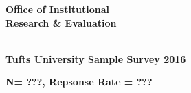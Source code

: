 \documentclass{article}
\begin{document}
\immediate{}
\pagestyle{fancy}
\fancyhf{}
\renewcommand{\headrulewidth}{0pt}
\renewcommand{\footrulewidth}{0pt}
\noindent\begin{minipage}{0.5\textwidth}
\begin{flushleft}
\end{flushleft}
\end{minipage}
\hfill
\noindent\begin{minipage}{0.5\textwidth}
\begin{flushright}
  \textbf{\Large Office of Institutional\\ Research \& Evaluation}
\end{flushright}
\end{minipage}
\hfill
\begin{center}
  \textbf{\Large \\Tufts University Sample Survey 2016 }
\end{center}
\begin{center}
  \textbf{\normalsize N= ???, Repsonse Rate = ??? }
\end{center}
\hline
\hline
\noindent\makebox[\linewidth]{\rule{\textwidth}{1pt}}
\nopagebreak

\end{document}
